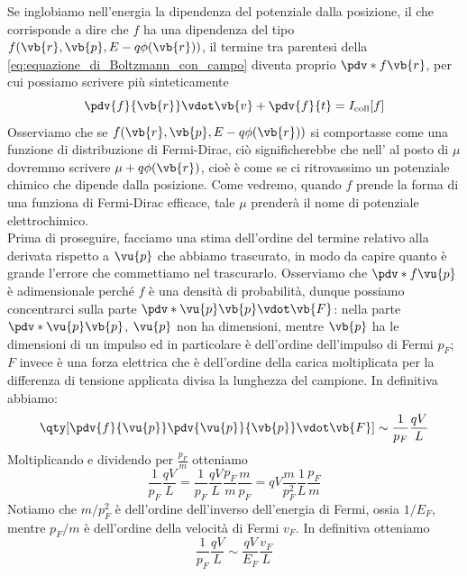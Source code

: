 Se inglobiamo nell'energia la dipendenza del potenziale dalla posizione, il che corrisponde a dire che $f$ ha una dipendenza del tipo $f(\vb{r},\vb{p}, E - q \phi(\vb{r}))$, il termine tra parentesi della \eqref{eq:equazione_di_Boltzmann_con_campo} diventa proprio $\pdv*{f}{\vb{r}}$, per cui possiamo scrivere più sinteticamente
\begin{equation}
    \pdv{f}{\vb{r}} \vdot \vb{v} + \pdv{f}{t}
    =I_{\rm coll}[f]
    \label{eq:equazione_di_Boltzmann_con_campo_sintetica}
\end{equation}
Osserviamo che se $f(\vb{r},\vb{p}, E - q \phi(\vb{r}))$ si comportasse come una funzione di distribuzione di Fermi-Dirac, ciò significherebbe che nell' al posto di $\mu$ dovremmo scrivere $\mu + q\phi(\vb{r})$, cioè è come se ci ritrovassimo un potenziale chimico che dipende dalla posizione. Come vedremo, quando $f$ prende la forma di una funziona di Fermi-Dirac efficace, tale $\mu$ prenderà il nome di potenziale elettrochimico.\\
Prima di proseguire, facciamo una stima dell'ordine del termine relativo alla derivata rispetto a $\vu{p}$ che abbiamo trascurato, in modo da capire quanto è grande l'errore che commettiamo nel trascurarlo. Osserviamo che $\pdv*{f}{\vu{p}}$ è adimensionale perché $f$ è una densità di probabilità, dunque possiamo concentrarci sulla parte $\pdv*{\vu{p}}{\vb{p}} \vdot \vb{F}$: nella parte $\pdv*{\vu{p}}{\vb{p}}$, $\vu{p}$ non ha dimensioni, mentre $\vb{p}$ ha le dimensioni di un impulso ed in particolare è dell'ordine dell'impulso di Fermi $p_F$; $F$ invece è una forza elettrica che è dell'ordine della carica moltiplicata per la differenza di tensione applicata divisa la lunghezza del campione. In definitiva abbiamo:
\begin{equation*}
    \qty[ \pdv{f}{\vu{p}} \pdv{\vu{p}}{\vb{p}} \vdot \vb{F} ]
    \sim \frac{1}{p_F} \frac{qV}{L}
\end{equation*}
Moltiplicando e dividendo per $\frac{p_F}{m}$ otteniamo
\begin{equation*}
    \frac{1}{p_F} \frac{qV}{L}
    =\frac{1}{p_F} \frac{qV}{L} \frac{p_F}{m} \frac{m}{p_F}
    =qV \frac{m}{p_F^2} \frac{1}{L} \frac{p_F}{m}
\end{equation*}
Notiamo che $m/p_F^2$ è dell'ordine dell'inverso dell'energia di Fermi, ossia $1/E_F$, mentre $p_F/m$ è dell'ordine della velocità di Fermi $v_F$. In definitiva otteniamo
\begin{equation*}
    \frac{1}{p_F} \frac{qV}{L}
    \sim \frac{qV}{E_F} \frac{v_F}{L}
\end{equation*}
